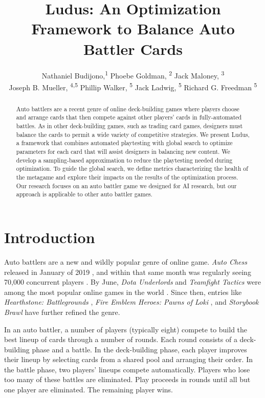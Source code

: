 \documentclass[letterpaper]{article} %
\title{{\sc Ludus}: An Optimization Framework to Balance Auto Battler Cards}
\author {
    Nathaniel Budijono\equalcontrib,\textsuperscript{\rm 1}
    Phoebe Goldman\equalcontrib, \textsuperscript{\rm 2}
    Jack Maloney\equalcontrib, \textsuperscript{\rm 3} \\
    Joseph B. Mueller, \textsuperscript{\rm 4,5}
    Phillip Walker, \textsuperscript{\rm 5}
    Jack Ladwig, \textsuperscript{\rm 5}
    Richard G. Freedman \textsuperscript{\rm 5}
}
\begin{document}
\maketitle

\begin{abstract}
  Auto battlers are a recent genre of online deck-building games where players choose and arrange cards that then compete against other players' cards in fully-automated battles. As in other deck-building games, such as trading card games, designers must balance the cards to permit a wide variety of competitive strategies.  We present {\sc Ludus}, a framework that combines automated playtesting with global search to optimize parameters for each card that will assist designers in balancing new content.  We develop a sampling-based approximation to reduce the playtesting needed during optimization.  To guide the global search, we define metrics characterizing the health of the metagame and explore their impacts on the results of the optimization process.  Our research focuses on an auto battler game we designed for AI research, but our approach is applicable to other auto battler games.
\end{abstract}

\section{Introduction} \label{sec:introduction}
Auto battlers are a new and wildly popular genre of online game.
\textit{Auto Chess} released in January of 2019 \cite{autochess}, and
within that same month was regularly seeing 70,000 concurrent players
\cite{auto-chess-what-and-why}. By June, \textit{Dota Underlords} and
\textit{Teamfight Tactics} were among the most popular online games in
the world \cite{autobattler-popularity}. Since then, entries like
\textit{Hearthstone: Battlegrounds} \cite{hearthstone-battlegrounds},
\textit{Fire Emblem Heroes: Pawns of Loki} \cite{feh-pawnsOfLoki-video},
and \textit{Storybook Brawl} \cite{storybook-brawl} have further refined the genre.


In an auto battler, a number of players (typically eight) compete to
build the best lineup of cards through a number of rounds. Each round consists of
a deck-building phase and a battle. In the deck-building phase, each
player improves their lineup by selecting cards from a shared pool and arranging their order. In
the battle phase, two players' lineups compete automatically. Players
who lose too many of these battles are eliminated. Play proceeds in
rounds until all but one player are eliminated. The remaining player
wins.
\end{document}
